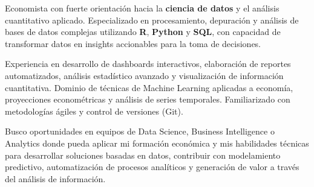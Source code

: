 \par{

	Economista con fuerte orientación hacia la \textbf{ciencia de datos} y el análisis cuantitativo aplicado. Especializado en procesamiento, depuración y análisis de bases de datos complejas utilizando \textbf{R}, \textbf{Python} y \textbf{SQL}, con capacidad de transformar datos en insights accionables para la toma de decisiones.

	Experiencia en desarrollo de dashboards interactivos, elaboración de reportes automatizados, análisis estadístico avanzado y visualización de información cuantitativa. Dominio de técnicas de Machine Learning aplicadas a economía, proyecciones econométricas y análisis de series temporales. Familiarizado con metodologías ágiles y control de versiones (Git).

	Busco oportunidades en equipos de Data Science, Business Intelligence o Analytics donde pueda aplicar mi formación económica y mis habilidades técnicas para desarrollar soluciones basadas en datos, contribuir con modelamiento predictivo, automatización de procesos analíticos y generación de valor a través del análisis de información.





}
